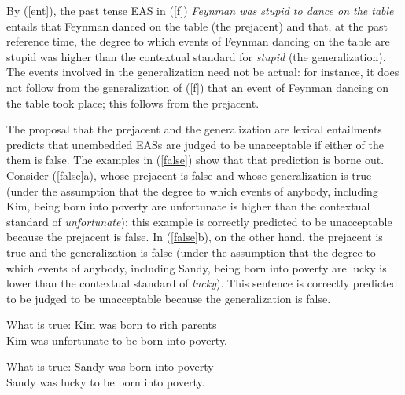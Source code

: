 \documentclass[11pt,fleqn]{article}
\def\infelic{{\leavevmode\llap{\#}}}
\newcommand{\6}{\mbox{$[\hspace*{-.6mm}[$}}
\newcommand{\9}{\mbox{$]\hspace*{-.6mm}]$}}
\begin{document}
By (\ref{ent}), the past tense EAS in (\ref{f}) {\em Feynman was stupid to dance on the table} entails that Feynman danced on the table (the prejacent) and that, at the past reference time, the degree to which events of Feynman dancing on the table are stupid was higher than the contextual standard for {\em stupid} (the generalization). The events involved in the generalization need not be actual: for instance, it does not follow from the generalization of (\ref{f}) that an event of Feynman dancing on the table took place; this follows from the prejacent.


The proposal that the prejacent and the generalization are lexical entailments predicts that unembedded EASs are judged to be unacceptable if either of the them is false. The examples in (\ref{false}) show that that prediction is borne out. Consider (\ref{false}a), whose prejacent is false and whose generalization is true (under the assumption that the degree to which events of anybody, including Kim, being born into poverty are unfortunate is higher than the contextual standard of {\em unfortunate}): this example is correctly predicted to be unacceptable because the prejacent is false. In (\ref{false}b), on the other hand, the prejacent is true and the generalization is false (under the assumption that the degree to which events of anybody, including Sandy, being born into poverty are lucky is lower than the contextual standard of {\em lucky}). This sentence is correctly predicted to be judged to be unacceptable because the generalization is false. 

\begin{exe}
\ex\label{false}
\begin{xlist}
\ex What is true: Kim was born to rich parents
\\ \infelic Kim was unfortunate to be born into poverty.

\ex What is true: Sandy was born into poverty
\\ \infelic Sandy was lucky to be born into poverty.

\end{xlist}
\end{exe}

\end{document}
